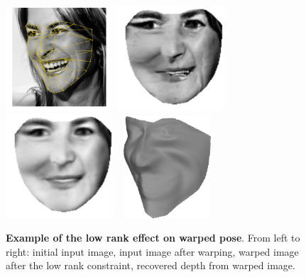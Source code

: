 \begin{figure}
    \centering
    \includegraphics[width=4cm]{collection_ps/images/example_warped_original}
    \includegraphics[width=4cm]{collection_ps/images/example_warped}
    \includegraphics[width=4cm]{collection_ps/images/example_warped_low_rank}
    \includegraphics[width=3.8cm,height=3.8cm,trim = 0cm -1cm 0cm 0cm]{collection_ps/images/example_warped_shape}
    \caption{{\bf Example of the low rank effect on warped pose}. From left to
             right: initial input image, input image after warping,
             warped image after the low rank constraint,
             recovered depth from warped image.}
\label{fig:imag_coll_low_rank_warping}
\end{figure}

